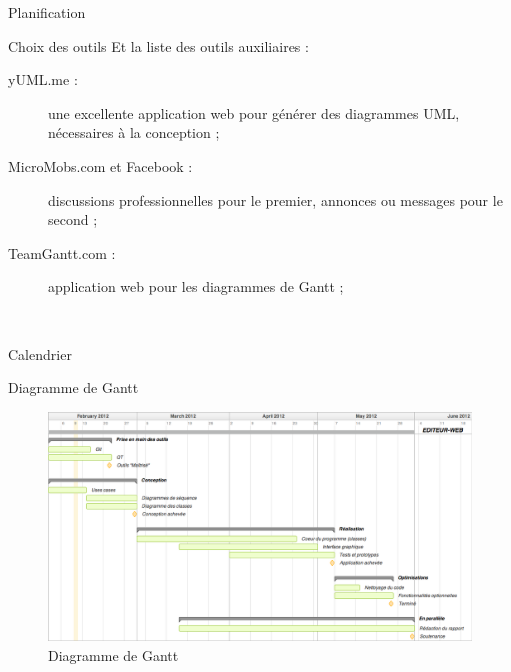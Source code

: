 \documentclass[a4paper, 12pt]{report}
\begin{document}
\begin{part}{Planification}
\begin{chapter}{Choix des outils}
			Et la liste des outils auxiliaires : 
			\begin{description}
				\item[yUML.me :] une excellente application web pour générer des diagrammes UML, nécessaires à la conception ;
				\item[MicroMobs.com et Facebook :] discussions professionnelles pour le premier, annonces ou messages pour le second ;
				\item[TeamGantt.com :] application web pour les diagrammes de Gantt ;		
			\end{description}~\\
		\end{chapter}
		\begin{chapter}{Calendrier}
			\begin{section}{Diagramme de Gantt}
				\begin{figure}[h]
					\begin{center}
						\includegraphics[width=17cm]{DiagrammeGantt.png}
						\caption{Diagramme de Gantt}
					\end{center}
				\end{figure}~\\
			\end{section}
		\end{chapter}
	\end{part}
\end{document}
